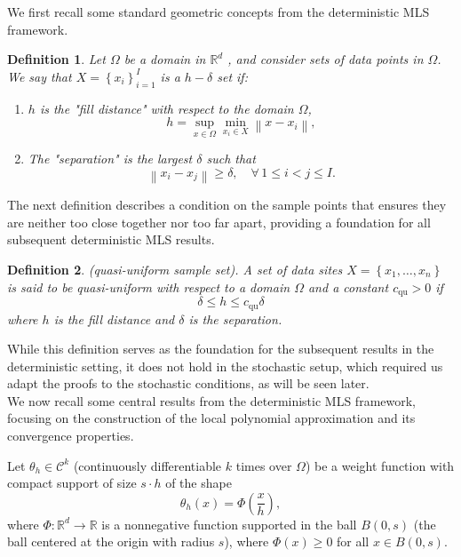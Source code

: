 \documentclass{article}
\newtheorem{definition}
{Definition}
\begin{document}
We first recall some standard geometric concepts from the deterministic MLS framework.
\begin{definition}
        Let $\Omega$ be a domain in $\mathbb{R}^d$ , and consider sets of data points in $\Omega$. We say that $X=\left\{x_i\right\}_{i=1}^I$ is a $h-\delta$ set if:
        \begin{enumerate}
            \item $h$ is the "fill distance" with respect to the domain $\Omega$, 
            \begin{equation*}
                h=\sup _{x \in \Omega} \min _{x_i \in X}\left\|x-x_i\right\|,
            \end{equation*}
            \item The "separation" is the largest $\delta$ such that 
            \begin{equation*}
                \left\|x_i-x_j\right\| \geq  \delta, \quad \forall \, 1 \leq i<j \leq I.
            \end{equation*}
        \end{enumerate}
\end{definition}
The next definition describes a condition on the sample points that ensures they are neither too close together nor too far apart, providing a foundation for all subsequent deterministic MLS results.
\begin{definition}
        (quasi-uniform sample set). A set of data sites $X=\left\{x_1, \ldots, x_n\right\}$ is said to be quasi-uniform with respect to a domain $\Omega$ and a constant $c_{\mathrm{qu}} > 0$ if
        $$\delta \leq h \leq c_{\mathrm{qu}} \delta $$
        where $h$ is the fill distance and $\delta$ is the separation.
        \label{h-delta-condition -levin}
\end{definition}  

While this definition serves as the foundation for the subsequent results in the deterministic setting, it does not hold in the stochastic setup, which required us adapt the proofs to the stochastic conditions, as will be seen later.\\
We now recall some central results from the deterministic MLS framework, focusing on the construction of the local polynomial approximation and its convergence properties.


Let $\theta_h \in \mathcal{C}^k$ (continuously differentiable $k$ times over $\Omega$) be a weight function with compact support of size $s\cdot h$ of the shape
\begin{equation}
 \theta_h(x)=\Phi\left(\frac{x}{h}\right),
 \label{theta_weight func}
\end{equation}
where $\Phi: \mathbb{R}^d \rightarrow \mathbb{R}$ is a nonnegative function supported in the ball $B(0,s)$ (the ball centered at the origin with radius $s$), where $\Phi(x)\geq 0$ for all $x\in B(0,s)$.
\end{document}
